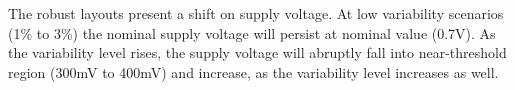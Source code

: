 \documentclass[diss,pgmicro,english]{iiufrgs}
\makeatletter
\newenvironment{conditions}
	{\par\vspace{\abovedisplayskip}\noindent\begin{tabular}{>{$}l<{$} @{${}={}$} l}}
	{\end{tabular}\par\vspace{\belowdisplayskip}}
\makeatother
\begin{document}
    The robust layouts present a shift on supply voltage. At low variability scenarios (1\% to 3\%) the nominal supply voltage will persist at nominal value (0.7V). As the variability level rises, the supply voltage will abruptly fall into near-threshold region (300mV to 400mV) and increase, as the variability level increases as well.


\end{document}
